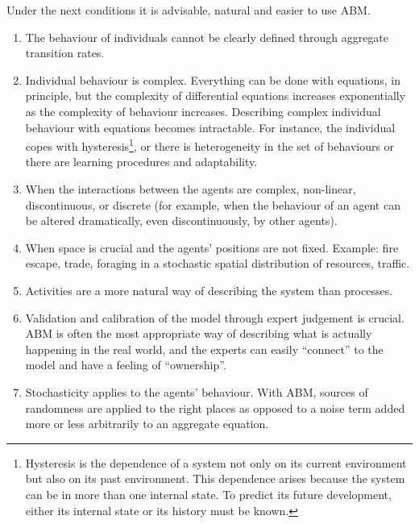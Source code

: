 \documentclass[11pt,oneside,a4paper,openright]{report}
\begin{document}

Under the next conditions it is advisable, natural and easier to use ABM.

\begin{enumerate}[i-] 
\item The behaviour of individuals cannot be clearly defined through aggregate transition rates.
\item Individual behaviour is complex. Everything can be done with equations, in principle, but the complexity of differential equations increases exponentially as the complexity of behaviour increases. Describing complex individual behaviour with equations becomes intractable. For instance, the individual copes with hysteresis\footnote{Hysteresis is the dependence of a system not only on its current environment but also on its past environment. This dependence arises because the system can be in more than one internal state. To predict its future development, either its internal state or its history must be known\cite[p.571–597]{hysteresisDef}.}, or there is heterogeneity in the set of behaviours or there are learning procedures and adaptability.
\item When the interactions between the agents are complex, non-linear, discontinuous, or discrete (for example, when the behaviour of an agent can be altered dramatically, even discontinuously, by other agents).
\item When space is crucial and the agents' positions are not fixed. Example: fire escape, trade, foraging in a stochastic spatial distribution of resources, traffic.
\item Activities are a more natural way of describing the system than processes.
\item Validation and calibration of the model through expert judgement is crucial. ABM is often the most appropriate way of describing what is actually happening in the real world, and the experts can easily “connect” to the model and have a feeling of “ownership”. 
\item Stochasticity applies to the agents' behaviour. With ABM, sources of randomness are applied to the right places as opposed to a noise term added more or less arbitrarily to an aggregate equation. 
\end{enumerate}
\end{document}
